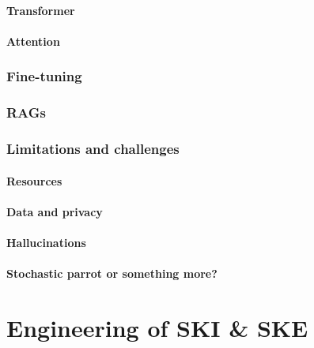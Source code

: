 \documentclass[12pt,a4paper,openright,twoside]{book}
\begin{document}
\subsection{Transformer}\label{subsec:transformer}

\subsection{Attention}\label{subsec:attention}

\section{Fine-tuning}\label{sec:llm-fine-tuning}

\section{\Acp{RAG}}\label{sec:rag}

\section{Limitations and challenges}\label{sec:limitations-and-challenges}

\subsection{Resources}\label{subsec:resources}

\subsection{Data and privacy}\label{subsec:data-and-privacy}

\subsection{Hallucinations}\label{subsec:hallucinations}

\subsection{Stochastic parrot or something more?}\label{subsec:stochastic-parrot-or-something-more}


\part{Engineering of \ac{SKI} \& \ac{SKE}}\label{part:engineering-of-ski-ske}
\end{document}
